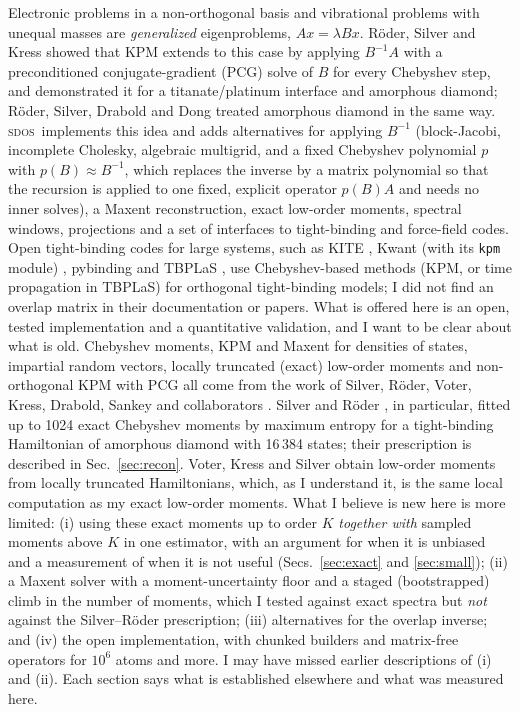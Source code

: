 \documentclass[reprint,nofootinbib,superscriptaddress,amsmath,amssymb,aps,prb,floatfix]{revtex4-2}
\newcommand{\sdos}{\textsc{sdos}}
\begin{document}
Electronic problems in a non-orthogonal basis and vibrational problems with unequal masses are \emph{generalized} eigenproblems, $A x=\lambda Bx$.
R\"oder, Silver and Kress \cite{roder1996} showed that KPM extends to this case by applying $B^{-1}A$ with a preconditioned conjugate-gradient (PCG) solve of $B$ for every Chebyshev step, and demonstrated it for a titanate/platinum interface and amorphous diamond; R\"oder, Silver, Drabold and Dong \cite{roder1997} treated amorphous diamond in the same way.
\sdos\ implements this idea and adds alternatives for applying $B^{-1}$ (block-Jacobi, incomplete Cholesky, algebraic multigrid, and a fixed Chebyshev polynomial $p$ with $p(B)\approx B^{-1}$, which replaces the inverse by a matrix polynomial so that the recursion is applied to one fixed, explicit operator $p(B)A$ and needs no inner solves), a Maxent reconstruction, exact low-order moments, spectral windows, projections and a set of interfaces to tight-binding and force-field codes.
Open tight-binding codes for large systems, such as KITE \cite{kite}, Kwant (with its \texttt{kpm} module) \cite{kwant}, pybinding \cite{pybinding} and TBPLaS \cite{tbplas}, use Chebyshev-based methods (KPM, or time propagation in TBPLaS) for orthogonal tight-binding models; I did not find an overlap matrix in their documentation or papers.
What is offered here is an open, tested implementation and a quantitative validation, and I want to be clear about what is old.
Chebyshev moments, KPM and Maxent for densities of states, impartial random vectors, locally truncated (exact) low-order moments and non-orthogonal KPM with PCG all come from the work of Silver, R\"oder, Voter, Kress, Drabold, Sankey and collaborators \cite{drabold1993,sankey1994,silver1994,silver1996,voter1996,roder1996,silver1997,roder1997}.
Silver and R\"oder \cite{silver1997}, in particular, fitted up to 1024 exact Chebyshev moments by maximum entropy for a tight-binding Hamiltonian of amorphous diamond with 16\,384 states; their prescription is described in Sec.~\ref{sec:recon}. Voter, Kress and Silver \cite{voter1996} obtain low-order moments from locally truncated Hamiltonians, which, as I understand it, is the same local computation as my exact low-order moments.
What I believe is new here is more limited: (i) using these exact moments up to order $K$ \emph{together with} sampled moments above $K$ in one estimator, with an argument for when it is unbiased and a measurement of when it is not useful (Secs.~\ref{sec:exact} and \ref{sec:small}); (ii) a Maxent solver with a moment-uncertainty floor and a staged (bootstrapped) climb in the number of moments, which I tested against exact spectra but \emph{not} against the Silver--R\"oder prescription; (iii) alternatives for the overlap inverse; and (iv) the open implementation, with chunked builders and matrix-free operators for $10^6$ atoms and more. I may have missed earlier descriptions of (i) and (ii).
Each section says what is established elsewhere and what was measured here.
\end{document}
